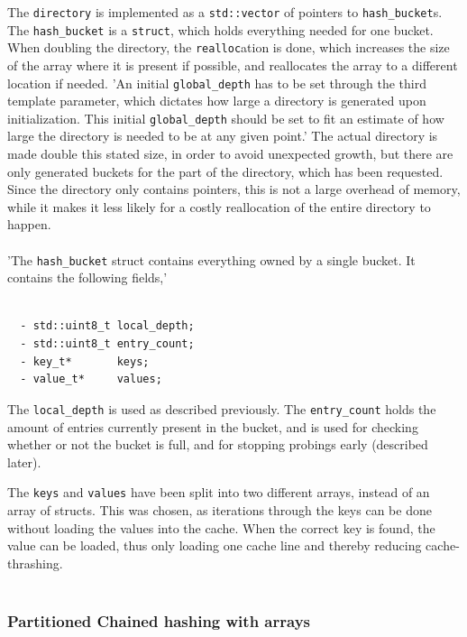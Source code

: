\documentclass[11pt]{article} %
\begin{document}
The \verb|directory| is implemented as a \verb|std::vector| of pointers to \verb|hash_bucket|s. The \verb|hash_bucket| is a \verb|struct|, which holds everything needed for one bucket. When doubling the directory, the \verb|realloc|ation is done, which increases the size of the array where it is present if possible, and reallocates the array to a different location if needed. 'An initial \verb|global_depth| has to be set through the third template parameter, which dictates how large a directory is generated upon initialization. This initial \verb|global_depth| should be set to fit an estimate of how large the directory is needed to be at any given point.' The actual directory is made double this stated size, in order to avoid unexpected growth, but there are only generated buckets for the part of the directory, which has been requested. Since the directory only contains pointers, this is not a large overhead of memory, while it makes it less likely for a costly reallocation of the entire directory to happen. \\
\\
'The \verb|hash_bucket| struct contains everything owned by a single bucket. It contains the following fields,'

\begin{lstlisting}[frame=single]  % Start your code-block

  - std::uint8_t local_depth;
  - std::uint8_t entry_count;
  - key_t*       keys;
  - value_t*     values;
\end{lstlisting}
The \verb|local_depth| is used as described previously. The \verb|entry_count| holds the amount of entries currently present in the bucket, and is used for checking whether or not the bucket is full, and for stopping probings early (described later). 

The \verb|keys| and \verb|values| have been split into two different arrays, instead of an array of structs. This was chosen, as iterations through the keys can be done without loading the values into the cache. When the correct key is found, the value can be loaded, thus only loading one cache line and thereby reducing cache-thrashing.\\
\\
\subsubsection{Partitioned Chained hashing with arrays}
\label{subsubsec:implementation_partitioned_array_hashing}
\end{document}
